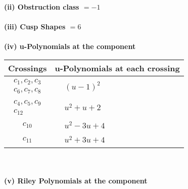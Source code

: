 \documentclass[1p]{elsarticle_modified}
\theoremstyle{definition}
\begin{document}
\flushleft \textbf{(ii) Obstruction class $= -1$}\\~\\
\flushleft \textbf{(iii) Cusp Shapes $= 6$}\\~\\
\newpage\renewcommand{\arraystretch}{1}
\flushleft \textbf{(iv) u-Polynomials at the component}\newline \\
\begin{tabular}{m{50pt}|m{274pt}}
Crossings & \hspace{64pt}u-Polynomials at each crossing \\
\hline $$\begin{aligned}c_{1},c_{2},c_{3}\\c_{6},c_{7},c_{8}\end{aligned}$$&$\begin{aligned}
&(u-1)^2
\end{aligned}$\\
\hline $$\begin{aligned}c_{4},c_{5},c_{9}\\c_{12}\end{aligned}$$&$\begin{aligned}
&u^2+u+2
\end{aligned}$\\
\hline $$\begin{aligned}c_{10}\end{aligned}$$&$\begin{aligned}
&u^2-3 u+4
\end{aligned}$\\
\hline $$\begin{aligned}c_{11}\end{aligned}$$&$\begin{aligned}
&u^2+3 u+4
\end{aligned}$\\
\hline
\end{tabular}\\~\\
\newpage\renewcommand{\arraystretch}{1}
\flushleft \textbf{(v) Riley Polynomials at the component}\newline \\
\end{document}
